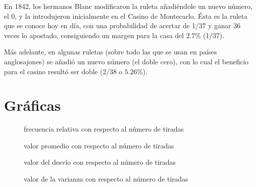 \documentclass{article}
\begin{document}
En 1842, los hermanos Blanc modificaron la ruleta añadiéndole un nuevo número, el 0, y la introdujeron inicialmente en el Casino de Montecarlo. Ésta es la ruleta que se conoce hoy en día, con una probabilidad de acertar de 1/37 y ganar 36 veces lo apostado, consiguiendo un margen para la casa del $2.7\%$ (1/37).

Más adelante, en algunas ruletas (sobre todo las que se usan en países anglosajones) se añadió un nuevo número (el doble cero), con lo cual el beneficio para el casino resultó ser doble (2/38 o $5.26\%$).

\section{Gráficas}
\begin{figure}[!htbp]
  \begin{mytikzresize}{0.6\textwidth}
    \centering
    
    \caption{frecuencia relativa con respecto al número de tiradas}
  \end{mytikzresize}
\end{figure}

\begin{figure}[!htbp]
  \begin{mytikzresize}{0.6\textwidth}
    \centering
    
    \caption{valor promedio con respecto al número de tiradas}
  \end{mytikzresize}
\end{figure}

\begin{figure}[!htbp]
  \begin{mytikzresize}{0.6\textwidth}
    \centering
    
    \caption{valor del desvío con respecto al número de tiradas}
  \end{mytikzresize}
\end{figure}

\begin{figure}[!htbp]
  \begin{mytikzresize}{0.6\textwidth}
    \centering
    
    \caption{valor de la varianza con respecto al número de tiradas}
  \end{mytikzresize}
\end{figure}

%
%
\end{document}
